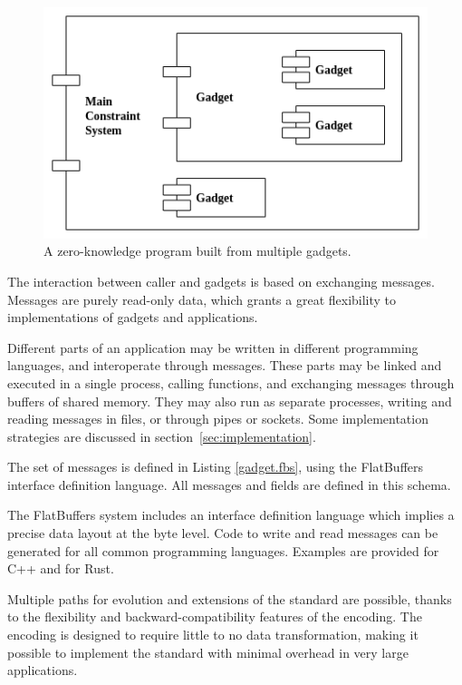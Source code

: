 \begin{figure}[!h]
	\centering
	\includegraphics[width=0.7\linewidth]{graphics/program_components.png}
	\caption{A zero-knowledge program built from multiple gadgets.}
	\label{fig:programcomponents}
\end{figure}



	The interaction between caller and gadgets is based on exchanging messages.
	Messages are purely read-only data, which grants a great flexibility to
	implementations of gadgets and applications.


	Different parts of an application may be written in different programming languages, and interoperate through messages.
	These parts may be linked and executed in a single process, calling functions,
	and exchanging messages through buffers of shared memory.
	They may also run as separate processes, writing and reading messages in files, or through pipes or sockets.
	Some implementation strategies are discussed in section~\ref{sec:implementation}.


	The set of messages is defined in Listing \ref{gadget.fbs}, 
	using the FlatBuffers interface definition language.
	All messages and fields are defined in this schema.

	The FlatBuffers system includes an interface definition language
	which implies a precise data layout at the byte level.
	Code to write and read messages can be generated for all common programming languages.
	Examples are provided for C++ and for Rust.

	Multiple paths for evolution and extensions of the standard are possible,
	thanks to the flexibility and backward-compatibility features of the encoding.
	The encoding is designed to require little to no data transformation, making it possible
	to implement the standard with minimal overhead in very large applications.

